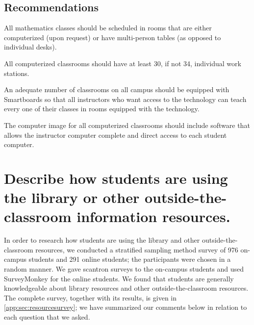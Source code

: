 \subsection{Recommendations}
All mathematics classes should be scheduled in rooms that are either computerized (upon request) or have multi-person tables (as opposed to individual desks).

All computerized classrooms should have at least 30, if not 34, individual work stations.

An adequate number of classrooms on all campus should be equipped with Smartboards so that all instructors who want access to the technology can teach every one of their classes in rooms equipped with the technology.

The computer image for all computerized classrooms should include software that allows the instructor computer complete and direct access to each student computer. 

\section{Describe how students are using the library or other outside-the-classroom information resources.  }
In order to research how students are using the library and other outside-the-classroom resources, we conducted a stratified sampling method survey of 976 on-campus students and 291 online students; the participants were chosen in a random manner.  We gave scantron surveys to the on-campus students and used SurveyMonkey for the online students. We found that students are generally knowledgeable about library resources and other outside-the-classroom resources.  The complete survey, together with its results, is given in \vref{app:sec:resourcesurvey}; we have summarized our comments below in relation to each question that we asked.

